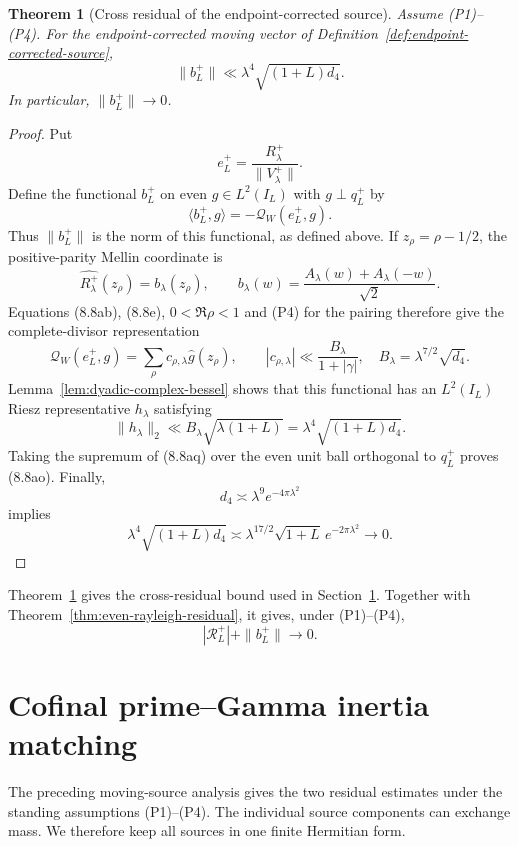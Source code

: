 \documentclass[11pt]{amsart}
\newtheorem{theorem}{Theorem}[section]
\theoremstyle{definition}
\theoremstyle{remark}
\newcommand{\QW}{\mathcal Q_W}
\begin{document}
\begin{theorem}[Cross residual of the endpoint-corrected source]
\label{thm:cross-residual-vanishing}
Assume (P1)--(P4).  For the endpoint-corrected moving vector of
Definition~\ref{def:endpoint-corrected-source},
\[
 \boxed{
 \|b_L^+\|
 \ll\lambda^4\sqrt{(1+L)d_4}.}
\tag{8.8ao}
\]
In particular, \(\|b_L^+\|\to0\).
\end{theorem}

\begin{proof}
Put
\[
 e_L^+=\frac{R_\lambda^+}{\|V_\lambda^+\|}.
\tag{8.8ap}
\]
Define the functional \(b_L^+\) on even \(g\in L^2(I_L)\) with
\(g\perp q_L^+\) by
\[
 \langle b_L^+,g\rangle=-\QW(e_L^+,g).
\tag{8.8aq}
\]
Thus \(\|b_L^+\|\) is the norm of this functional, as defined above.
If \(z_\rho=\rho-1/2\), the positive-parity Mellin coordinate is
\[
 \widehat {R_\lambda^+}(z_\rho)
 =b_\lambda(z_\rho),
 \qquad
 b_\lambda(w)=\frac{A_\lambda(w)+A_\lambda(-w)}{\sqrt2}.
\tag{8.8ar}
\]
Equations (8.8ab), (8.8e), \(0<\Re\rho<1\) and (P4) for the pairing
therefore give the complete-divisor representation
\[
 \QW(e_L^+,g)
 =\sum_\rho c_{\rho,\lambda}\widehat g(z_\rho),
 \qquad
 |c_{\rho,\lambda}|
 \ll\frac{B_\lambda}{1+|\gamma|},
 \quad
 B_\lambda=\lambda^{7/2}\sqrt{d_4}.
\tag{8.8as}
\]
Lemma~\ref{lem:dyadic-complex-bessel} shows that this functional has an
\(L^2(I_L)\) Riesz representative \(h_\lambda\) satisfying
\[
 \|h_\lambda\|_2
 \ll B_\lambda\sqrt{\lambda(1+L)}
 =\lambda^4\sqrt{(1+L)d_4}.
\tag{8.8at}
\]
Taking the supremum of (8.8aq) over the even unit ball orthogonal to
\(q_L^+\) proves (8.8ao).  Finally,
\[
 d_4\asymp\lambda^9e^{-4\pi\lambda^2}
\tag{8.8au}
\]
implies
\[
 \lambda^4\sqrt{(1+L)d_4}
 \asymp\lambda^{17/2}\sqrt{1+L}\,e^{-2\pi\lambda^2}
 \longrightarrow0.
\tag{8.8av}
\]
\end{proof}

Theorem~\ref{thm:cross-residual-vanishing} gives the cross-residual
bound used in Section~\ref{sec:cofinal-inertia}.  Together with
Theorem~\ref{thm:even-rayleigh-residual}, it gives, under (P1)--(P4),
\[
 |\mathscr R_L^+|+\|b_L^+\|\longrightarrow0.
\tag{8.8aw}
\]

\section{Cofinal prime--Gamma inertia matching}
\label{sec:cofinal-inertia}

The preceding moving-source analysis gives the two residual estimates under the standing assumptions (P1)--(P4).
The individual source components can exchange mass.  We therefore keep
all sources in one finite Hermitian form.
\end{document}

